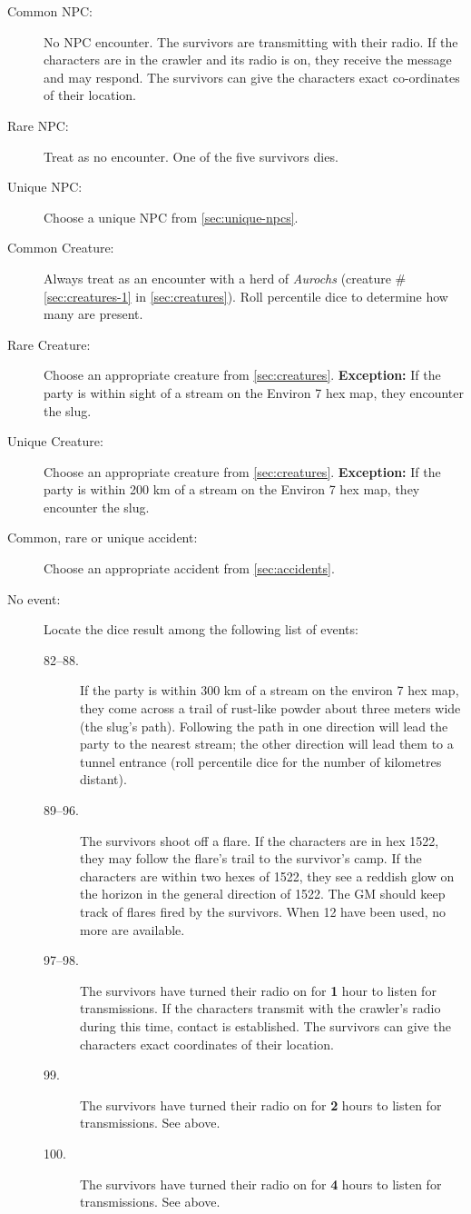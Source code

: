 \begin{description}
\item[Common NPC:] No NPC encounter. The survivors are transmitting
  with their radio. If the characters are in the crawler and its radio
  is on, they receive the message and may respond. The survivors can
  give the characters exact co-ordinates of their location.
\item[Rare NPC:] Treat as no encounter. One of the five survivors
  dies.
\item[Unique NPC:] Choose a unique NPC from \ref{sec:unique-npcs}.
\item[Common Creature:] Always treat as an encounter with a herd of
  \emph{Aurochs} (creature \#\ref{sec:creatures-1} in
  \ref{sec:creatures}). Roll 
  percentile dice to determine how many are present.
\item[Rare Creature:] Choose an appropriate creature from
  \ref{sec:creatures}.  \textbf{Exception:} If the party is within
  sight of a stream on the Environ 7 hex map, they encounter the slug.
\item[Unique Creature:] Choose an appropriate creature from
  \ref{sec:creatures}. \textbf{Exception:} If the party is within 200
  km of a stream on the Environ 7 hex map, they encounter the slug.
\item[Common, rare or unique accident:] Choose an appropriate accident
  from \ref{sec:accidents}.
\item[No event:] Locate the dice result among the following list of
  events:
  \begin{description}
  \item[82--88.] If the party is within 300 km of a stream on the
    environ 7 hex map, they come across a trail of rust-like powder
    about three meters wide (the slug's path). Following the path in
    one direction will lead the party to the nearest stream; the other
    direction will lead them to a tunnel entrance (roll percentile
    dice for the number of kilometres distant).
  \item[89--96.] The survivors shoot off a flare. If the characters
    are in hex 1522, they may follow the flare's trail to the
    survivor's camp. If the characters are within two hexes of 1522,
    they see a reddish glow on the horizon in the general direction of
    1522. The GM should keep track of flares fired by the survivors.
    When 12 have been used, no more are available.
  \item[97--98.] The survivors have turned their radio on for
    \textbf{1} hour to listen for transmissions. If the characters
    transmit with the crawler's radio during this time, contact is
    established. The survivors can give the characters exact
    coordinates of their location.
  \item[99.] The survivors have turned their radio on for \textbf{2}
    hours to listen for transmissions. See above.
  \item[100.] The survivors have turned their radio on for \textbf{4}
    hours to listen for transmissions. See above.
  \end{description}
\end{description}

